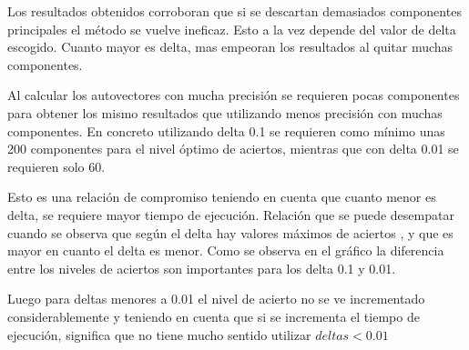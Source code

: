
Los resultados obtenidos corroboran que si se descartan demasiados componentes principales el método se vuelve ineficaz. Esto a la vez 
depende del valor de delta escogido. Cuanto mayor es delta, mas empeoran los resultados al quitar muchas componentes.

Al calcular los autovectores con mucha precisión se requieren pocas componentes para obtener los 
mismo resultados que utilizando menos precisión con muchas componentes. 
En concreto utilizando delta 0.1 se requieren como mínimo unas 200 componentes para el nivel óptimo de aciertos, mientras que con delta 0.01
se requieren solo 60.

Esto es una relación de compromiso teniendo en cuenta que cuanto menor es delta, se requiere mayor tiempo de ejecución.
Relación que se puede desempatar cuando se observa que según el delta hay valores máximos de aciertos , y que es mayor en cuanto el delta es menor.
Como se observa en el gráfico la diferencia entre los niveles de aciertos son importantes para los delta 0.1 y 0.01.

Luego para deltas menores a 0.01 el nivel de acierto no se ve incrementado considerablemente y teniendo en cuenta que si se incrementa el tiempo de
ejecución, significa que no tiene mucho sentido utilizar $deltas < 0.01$
